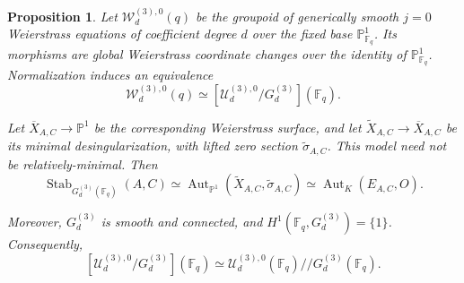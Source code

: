 \documentclass[a4paper,12pt]{amsart}
\newtheorem{prop}[thm]{Proposition}
\theoremstyle{definition}
\newcommand{\cU}{\mathcal{U}}
\newcommand{\cW}{\mathcal{W}}
\newcommand{\Fb}{\mathbb{F}}
\newcommand{\Pb}{\mathbb{P}}
\newcommand{\Aut}{\operatorname{Aut}}
\begin{document}
\begin{prop}
\label{prop:char3-normalized-quotient}
Let $\cW_d^{(3),0}(q)$ be the groupoid of generically smooth $j=0$ Weierstrass equations of coefficient degree $d$ over the fixed base $\Pb^1_{\Fb_q}$.  Its morphisms are global Weierstrass coordinate changes over the identity of $\Pb^1_{\Fb_q}$.  Normalization induces an equivalence
\[
\cW_d^{(3),0}(q)
\simeq
[\cU_d^{(3),0}/G_d^{(3)}](\Fb_q).
\]

Let $\overline X_{A,C}\to\Pb^1$ be the corresponding Weierstrass surface, and let $\widetilde X_{A,C}\to\overline X_{A,C}$ be its minimal desingularization, with lifted zero section $\widetilde\sigma_{A,C}$.  This model need not be relatively-minimal.
Then
\[
\operatorname{Stab}_{G_d^{(3)}(\Fb_q)}(A,C)
\simeq
\Aut_{\Pb^1}
  (\widetilde X_{A,C},\widetilde\sigma_{A,C})
\simeq
\Aut_K(E_{A,C},O).
\]

Moreover, $G_d^{(3)}$ is smooth and connected, and $H^1(\Fb_q,G_d^{(3)})=\{1\}$.  Consequently,
\[
[\cU_d^{(3),0}/G_d^{(3)}](\Fb_q)
\simeq
\cU_d^{(3),0}(\Fb_q)\mathbin{//}G_d^{(3)}(\Fb_q).
\]
\end{prop}
\end{document}
